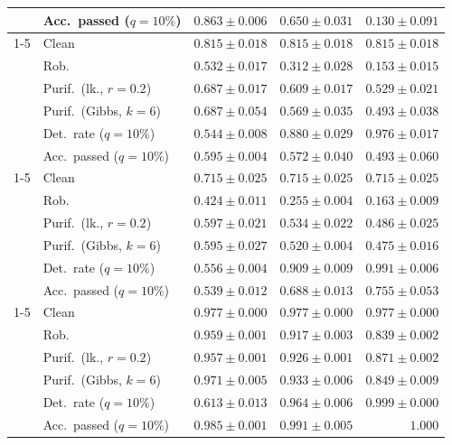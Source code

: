 \begin{table}[htbp]
\begin{tabular}{@{}llrrr@{}}
     & Acc.\ passed ($q{=}10\%$) & $0.863 \pm 0.006$ & $0.650 \pm 0.031$ & $0.130 \pm 0.091$ \\
    \cmidrule(lr){1-5}
    \multirow{6}{*}{$\alpha{=}0.1$} & Clean & $0.815 \pm 0.018$ & $0.815 \pm 0.018$ & $0.815 \pm 0.018$ \\
     & Rob. & $0.532 \pm 0.017$ & $0.312 \pm 0.028$ & $0.153 \pm 0.015$ \\
     & Purif.\ (lk., $r{=}0.2$) & $0.687 \pm 0.017$ & $0.609 \pm 0.017$ & $0.529 \pm 0.021$ \\
     & Purif.\ (Gibbs, $k{=}6$) & $0.687 \pm 0.054$ & $0.569 \pm 0.035$ & $0.493 \pm 0.038$ \\
     & Det.\ rate ($q{=}10\%$) & $0.544 \pm 0.008$ & $0.880 \pm 0.029$ & $0.976 \pm 0.017$ \\
     & Acc.\ passed ($q{=}10\%$) & $0.595 \pm 0.004$ & $0.572 \pm 0.040$ & $0.493 \pm 0.060$ \\
    \cmidrule(lr){1-5}
    \multirow{6}{*}{$\alpha{=}1$} & Clean & $0.715 \pm 0.025$ & $0.715 \pm 0.025$ & $0.715 \pm 0.025$ \\
     & Rob. & $0.424 \pm 0.011$ & $0.255 \pm 0.004$ & $0.163 \pm 0.009$ \\
     & Purif.\ (lk., $r{=}0.2$) & $0.597 \pm 0.021$ & $0.534 \pm 0.022$ & $0.486 \pm 0.025$ \\
     & Purif.\ (Gibbs, $k{=}6$) & $0.595 \pm 0.027$ & $0.520 \pm 0.004$ & $0.475 \pm 0.016$ \\
     & Det.\ rate ($q{=}10\%$) & $0.556 \pm 0.004$ & $0.909 \pm 0.009$ & $0.991 \pm 0.006$ \\
     & Acc.\ passed ($q{=}10\%$) & $0.539 \pm 0.012$ & $0.688 \pm 0.013$ & $0.755 \pm 0.053$ \\
    \cmidrule(lr){1-5}
    \multirow{6}{*}{AT ($\alpha{=}0$)} & Clean & $0.977 \pm 0.000$ & $0.977 \pm 0.000$ & $0.977 \pm 0.000$ \\
     & Rob. & $\mathbf{0.959 \pm 0.001}$ & $\mathbf{0.917 \pm 0.003}$ & $\mathbf{0.839 \pm 0.002}$ \\
     & Purif.\ (lk., $r{=}0.2$) & $\mathbf{0.957 \pm 0.001}$ & $\mathbf{0.926 \pm 0.001}$ & $\mathbf{0.871 \pm 0.002}$ \\
     & Purif.\ (Gibbs, $k{=}6$) & $\mathbf{0.971 \pm 0.005}$ & $\mathbf{0.933 \pm 0.006}$ & $\mathbf{0.849 \pm 0.009}$ \\
     & Det.\ rate ($q{=}10\%$) & $0.613 \pm 0.013$ & $0.964 \pm 0.006$ & $0.999 \pm 0.000$ \\
     & Acc.\ passed ($q{=}10\%$) & $\mathbf{0.985 \pm 0.001}$ & $\mathbf{0.991 \pm 0.005}$ & $\mathbf{1.000}$ \\

\end{tabular}
\end{table}
